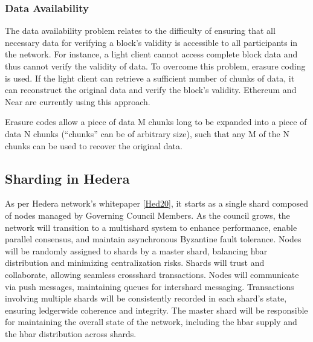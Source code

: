 \documentclass[letterpaper,10pt,english]{jupyterBook}
\begin{document}
\subsubsection{Data Availability}
\label{\detokenize{SHARDING/sharding:data-availability}}
\sphinxAtStartPar
The data availability problem relates to the difficulty of ensuring that all necessary data for verifying a block’s validity is accessible to all participants in the network. For instance, a light client cannot access complete block data and thus cannot
verify the validity of data. To overcome this problem, erasure coding is used. If the light client can retrieve a sufficient number of chunks of data, it can reconstruct the original data and verify the block’s validity. Ethereum and Near are currently using this approach.

\begin{sphinxShadowBox}

\sphinxAtStartPar
Erasure codes allow a piece of data M chunks long to be expanded into a piece of data N chunks (“chunks” can be of arbitrary size), such that any M of the N chunks can be used to recover the original data.
\end{sphinxShadowBox}


\subsection{Sharding in Hedera}
\label{\detokenize{SHARDING/sharding:sharding-in-hedera}}
\sphinxAtStartPar
As per Hedera network’s whitepaper {[}\hyperlink{cite.SHARDING/sharding:id69}{Hed20}{]}, it starts as a single shard composed of nodes managed by Governing Council Members. As the council grows, the network will transition to a multi\sphinxhyphen{}shard system to enhance performance, enable parallel consensus, and maintain asynchronous Byzantine fault tolerance. Nodes will be randomly assigned to shards by a master shard, balancing hbar distribution and minimizing centralization risks. Shards will trust and collaborate, allowing seamless cross\sphinxhyphen{}shard transactions. Nodes will communicate via push messages, maintaining queues for inter\sphinxhyphen{}shard messaging. Transactions involving multiple shards will be consistently recorded in each shard’s state, ensuring ledger\sphinxhyphen{}wide coherence and integrity. The master shard will be responsible for maintaining the overall state of the network, including the hbar supply and the hbar distribution across shards.
\end{document}

